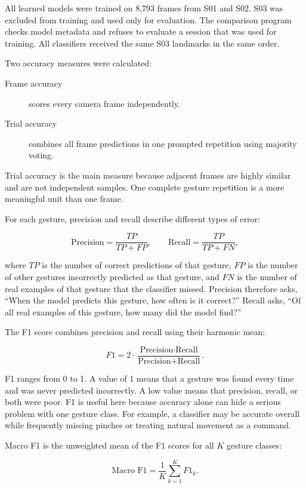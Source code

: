 \documentclass[11pt,a4paper]{article}
\begin{document}
All learned models were trained on 8,793 frames from S01 and S02. S03 was
excluded from training and used only for evaluation. The comparison program
checks model metadata and refuses to evaluate a session that was used for
training. All classifiers received the same S03 landmarks in the same order.

Two accuracy measures were calculated:

\begin{description}
  \item[Frame accuracy] scores every camera frame independently.
  \item[Trial accuracy] combines all frame predictions in one prompted
  repetition using majority voting.
\end{description}

Trial accuracy is the main measure because adjacent frames are highly similar
and are not independent samples. One complete gesture repetition is a more
meaningful unit than one frame.

For each gesture, precision and recall describe different types of error:

\[
\text{Precision} = \frac{TP}{TP+FP},
\qquad
\text{Recall} = \frac{TP}{TP+FN},
\]

where $TP$ is the number of correct predictions of that gesture, $FP$ is the
number of other gestures incorrectly predicted as that gesture, and $FN$ is the
number of real examples of that gesture that the classifier missed. Precision
therefore asks, ``When the model predicts this gesture, how often is it
correct?'' Recall asks, ``Of all real examples of this gesture, how many did the
model find?''

The F1 score combines precision and recall using their harmonic mean:

\[
F1 = 2\cdot
\frac{\text{Precision}\cdot\text{Recall}}
{\text{Precision}+\text{Recall}}.
\]

F1 ranges from 0 to 1. A value of 1 means that a gesture was found every time
and was never predicted incorrectly. A low value means that precision, recall,
or both were poor. F1 is useful here because accuracy alone can hide a serious
problem with one gesture class. For example, a classifier may be accurate
overall while frequently missing pinches or treating natural movement as a
command.

Macro F1 is the unweighted mean of the F1 scores for all $K$ gesture classes:

\[
\text{Macro F1} = \frac{1}{K}\sum_{k=1}^{K} F1_k.
\]
\end{document}
